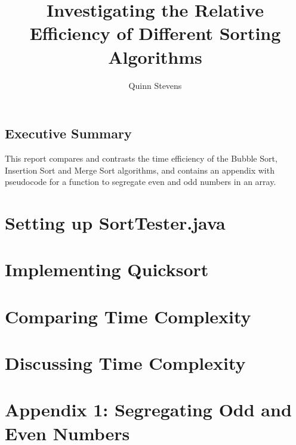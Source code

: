 \documentclass{report}
\author{Quinn Stevens}
\title{Investigating the Relative Efficiency of Different Sorting Algorithms}
\begin{document}
\maketitle

\section*{Executive Summary}
This report compares and contrasts the time efficiency of the Bubble Sort, Insertion Sort and Merge Sort algorithms, and contains an appendix with pseudocode for a function to segregate even and odd numbers in an array.

\tableofcontents

\chapter{Setting up Sort\textunderscore Tester.java}


\chapter{Implementing Quicksort}

\chapter{Comparing Time Complexity}

\chapter{Discussing Time Complexity}

\chapter*{Appendix 1: Segregating Odd and Even Numbers}
\end{document}
